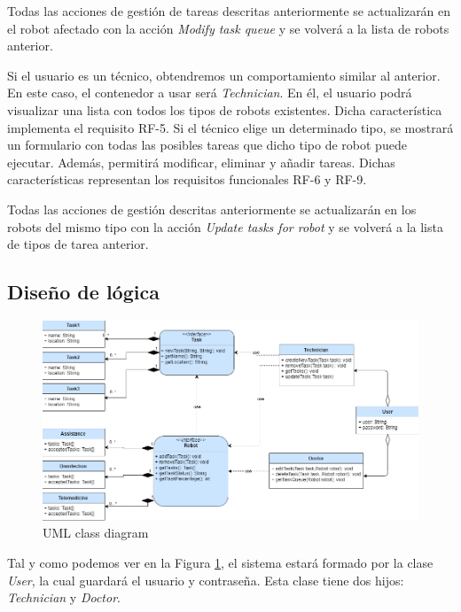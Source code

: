 Todas las acciones de gestión de tareas descritas anteriormente se actualizarán en el robot afectado con la acción \textit{Modify task queue} y se volverá a la lista de robots anterior.

Si el usuario es un técnico, obtendremos un comportamiento similar al anterior. En este caso, el contenedor a usar será \textit{Technician}. En él, el usuario podrá visualizar una lista con todos los tipos de robots existentes. Dicha característica implementa el requisito RF-5. Si el técnico elige un determinado tipo, se mostrará un formulario con todas las posibles tareas que dicho tipo de robot puede ejecutar. Además, permitirá modificar, eliminar y añadir tareas. Dichas características representan los requisitos funcionales RF-6 y RF-9.

Todas las acciones de gestión descritas anteriormente se actualizarán en los robots del mismo tipo con la acción \textit{Update tasks for robot} y se volverá a la lista de tipos de tarea anterior.

\subsection{Diseño de lógica}

\begin{figure}[H]
	\centering
	\includegraphics[width=1\textwidth]{images/class-diagram.png}
	\caption{UML class diagram}
	\label{fig:UMLModel}
\end{figure}
 Tal y como podemos ver en la Figura \ref{fig:UMLModel}, el sistema estará formado por la clase \textit{User}, la cual guardará el usuario y contraseña. Esta clase tiene dos hijos: \textit{Technician} y \textit{Doctor}.
 
